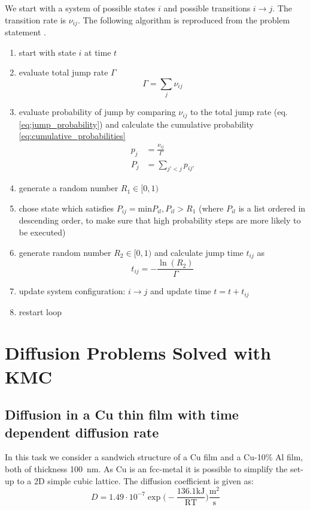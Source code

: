 We start with a system of possible states \(i\) and possible transitions \(i \rightarrow j\). The transition rate is \(\nu_{ij}\). The following algorithm is reproduced from the problem statement \cite{zaiserb}.

\begin{enumerate}
	\item start with state \(i\) at time \(t\)
	\item evaluate total jump rate $\Gamma$ \begin{equation}
		\Gamma = \sum\limits_{j}\nu_{ij} \label{eq:total_jump_rate}
	\end{equation} 
	\item evaluate probability of jump by comparing \( \nu_{ij} \) to the total jump rate (eq. \ref{eq:jump_probability}) and calculate the cumulative probability \ref{eq:cumulative_probabilities} 
	\begin{subequations}
		\begin{align}
			p_{j} & = \frac{\nu_{ij}}{\Gamma} \label{eq:jump_probability} \\
			 P_{j }&= \sum\limits_{j'<j}p_{ij'} \label{eq:cumulative_probabilities}
		\end{align}
	\end{subequations} 
	\item generate a random number \(R_{1} \in [0,1)\)
	\item chose state which satisfies \( P_{ij} = \mathrm{min}{P_{il}, P_{il} > R_{1}}\) (where \(P_{il}\) is a list ordered in descending order, to make sure that high probability steps are more likely to be executed)
	\item generate random number \(R_{2} \in [0,1)\) and calculate jump time \(t_{ij}\) as
	\begin{equation}
		t_{ij} = - \frac{\ln(R_{2})}{\Gamma}
	\end{equation}
	\item update system configuration: \(i \rightarrow j\) and update time \(t = t + t_{ij}\)
	\item restart loop

\end{enumerate} 

\section{Diffusion Problems Solved with KMC}
\subsection{Diffusion in a Cu thin film with time dependent diffusion rate}\label{sec:task1}
In this task we consider a sandwich structure of a Cu film and a Cu-10\% Al film, both of thickness 100~nm. As Cu is an fcc-metal it is possible to simplify the set-up to a 2D simple cubic lattice. The diffusion coefficient is given as:
\begin{equation}
	D = 1.49 \cdot 10^{-7} \exp \bigl( - \frac{136.1 \mathrm{kJ}}{\mathrm{R T}}   \bigr) \frac{\mathrm{m}^{2}}{\mathrm{s}}
\end{equation}

